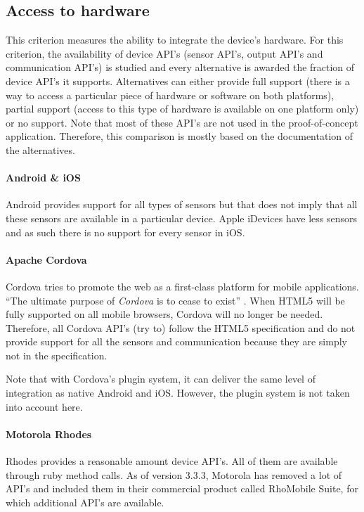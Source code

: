\subsection{Access to hardware}

This criterion measures the ability to integrate the device's hardware. For this criterion, the availability of device API's (sensor API's, output API's and communication API's) is studied and every alternative is awarded the fraction of device API's it supports. Alternatives can either provide full support (there is a way to access a particular piece of hardware or software on both platforms), partial support (access to this type of hardware is available on one platform only) or no support. Note that most of these API's are not used in the proof-of-concept application. Therefore, this comparison is mostly based on the documentation of the alternatives.

\paragraph{Android \& iOS} Android provides support for all types of sensors but that does not imply that all these sensors are available in a particular device. Apple iDevices have less sensors and as such there is no support for every sensor in iOS.

\paragraph{Apache Cordova} Cordova tries to promote the web as a first-class platform for mobile applications. ``The ultimate purpose of \emph{Cordova} is to cease to exist'' \cite{LeRoux:2012}. When HTML5 will be fully supported on all mobile browsers, Cordova will no longer be needed. Therefore, all Cordova API's (try to) follow the HTML5 specification and do not provide support for all the sensors and communication because they are simply not in the specification.

Note that with Cordova's plugin system, it can deliver the same level of integration as native Android and iOS. However, the plugin system is not taken into account here. 

\paragraph{Motorola Rhodes} Rhodes provides a reasonable amount device API's. All of them are available through ruby method calls. As of version 3.3.3, Motorola has removed a lot of API's and included them in their commercial product called RhoMobile Suite, for which additional API's are available.


